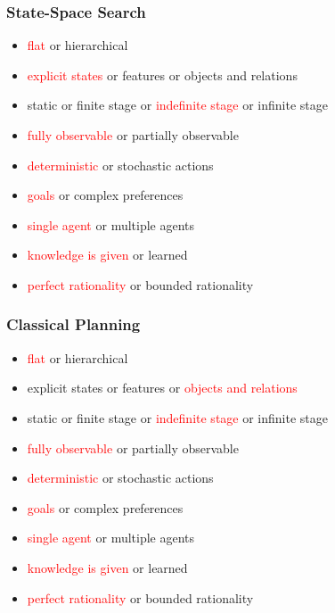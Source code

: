 \documentclass[UTF8,11pt,colorlinks,compress,openany]{beamer}%
\begin{document}
\begin{frame}\frametitle{State-Space Search}
\begin{itemize}
	\item \textcolor{red}{flat} or hierarchical
	\item \textcolor{red}{explicit states} or features or objects and relations
	\item static or finite stage or \textcolor{red}{indefinite stage} or infinite stage
	\item \textcolor{red}{fully observable} or partially observable
	\item \textcolor{red}{deterministic} or stochastic actions
	\item \textcolor{red}{goals} or complex preferences
	\item \textcolor{red}{single agent} or multiple agents
	\item \textcolor{red}{knowledge is given} or learned
	\item \textcolor{red}{perfect rationality} or bounded rationality
\end{itemize}
\end{frame}

\begin{frame}\frametitle{Classical Planning}
\begin{itemize}
	\item \textcolor{red}{flat} or hierarchical
	\item explicit states or features or \textcolor{red}{objects and relations}
	\item static or finite stage or \textcolor{red}{indefinite stage} or infinite stage
	\item \textcolor{red}{fully observable} or partially observable
	\item \textcolor{red}{deterministic} or stochastic actions
	\item \textcolor{red}{goals} or complex preferences
	\item \textcolor{red}{single agent} or multiple agents
	\item \textcolor{red}{knowledge is given} or learned
	\item \textcolor{red}{perfect rationality} or bounded rationality
\end{itemize}
\end{frame}
\end{document}
